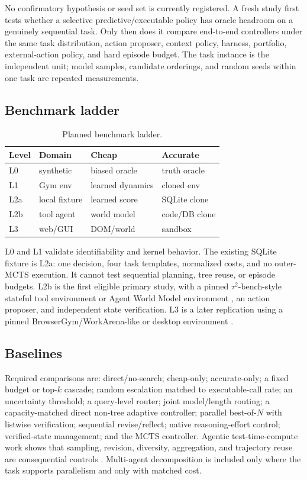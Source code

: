 \documentclass[10pt,twocolumn]{article}
\begin{document}
No confirmatory hypothesis or seed set is currently registered. A fresh study
first tests whether a selective predictive/executable policy has oracle
headroom on a genuinely sequential task. Only then does it compare end-to-end
controllers under the same task distribution, action proposer, context policy,
harness, portfolio, external-action policy, and hard episode budget. The task
instance is the independent unit; model samples, candidate orderings, and
random seeds within one task are repeated measurements.

\subsection{Benchmark ladder}

\begin{table}[t]
\centering
\small
\caption{Planned benchmark ladder.}
\label{tab:benchmarks}
\begin{tabularx}{\columnwidth}{@{}lXXX@{}}
\toprule
Level & Domain & Cheap & Accurate \\
\midrule
L0 & synthetic & biased oracle & truth oracle \\
L1 & Gym env & learned dynamics & cloned env \\
L2a & local fixture & learned score & SQLite clone \\
L2b & tool agent & world model & code/DB clone \\
L3 & web/GUI & DOM/world & sandbox \\
\bottomrule
\end{tabularx}
\end{table}

L0 and L1 validate identifiability and kernel behavior. The existing SQLite
fixture is L2a: one decision, four task templates, normalized costs, and no
outer-MCTS execution. It cannot test sequential planning, tree reuse, or
episode budgets. L2b is the first eligible primary study, with a pinned
$\tau^2$-bench-style stateful tool environment or Agent World Model
environment \citep{barres2025tau2,wang2026agentworld}, an action proposer, and
independent state verification. L3 is a later replication using a pinned
BrowserGym/WorkArena-like or desktop environment
\citep{le2025browsergym,drouin2024workarena}.

\subsection{Baselines}

Required comparisons are: direct/no-search; cheap-only; accurate-only; a fixed
budget or top-\(k\) cascade; random escalation matched to executable-call rate;
an uncertainty threshold; a query-level router; joint model/length routing; a
capacity-matched direct non-tree adaptive controller; parallel best-of-\(N\)
with listwise verification; sequential revise/reflect; native reasoning-effort
control; verified-state management; and the MCTS controller. Agentic
test-time-compute work shows that sampling, revision, diversity, aggregation,
and trajectory reuse are consequential controls
\citep{zhu2025agentcompute,kim2026coding}. Multi-agent decomposition is included
only where the task supports parallelism and only with matched cost.
\end{document}
